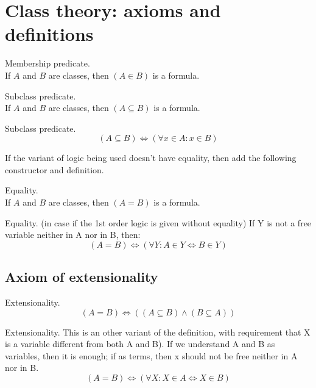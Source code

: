 \def\topic{}


\section{Class theory: axioms and definitions}%

\begin{constructor} Membership predicate.\\
If $A$ and $B$ are classes, then $(A\in B)$ is a formula.
\end{constructor}



\begin{constructor} Subclass predicate.\\
If $A$ and $B$ are classes, then $(A\subseteq B)$ is a formula.
\end{constructor}
\begin{definition}
\label{def:subclass}
Subclass predicate.
\[
(A\subseteq B)\iff(\forall x\in A:x\in B)
\]
\end{definition}



If the variant of logic being used doesn't have equality, then add the following constructor and definition.
\begin{constructor}Equality.\\
If $A$ and $B$ are classes, then $(A=B)$ is a formula.
\end{constructor}
\begin{definition}
Equality. (in case if the 1st order logic is given without equality)
If Y is not a free variable neither in A nor in B, then:
\[
(A=B)\iff (\forall Y: A\in Y \iff B\in Y)
\]
\end{definition}
\subsection{Axiom of extensionality}
\begin{axiom}
\label{axm:extensionality}
Extensionality.
\[
(A=B)\iff ((A\subseteq B) \land (B\subseteq A))
\]
\end{axiom}
\begin{axiom*}
\label{axm:extensionality'}
Extensionality. This is an other variant of the definition, with requirement that X is a variable different from both A and B). If we understand A and B as variables, then it is enough; if as terms, then x should not be free neither in A nor in  B.
\[
(A=B)\iff (\forall X: X\in A \iff X\in B)
\]
\end{axiom*}


